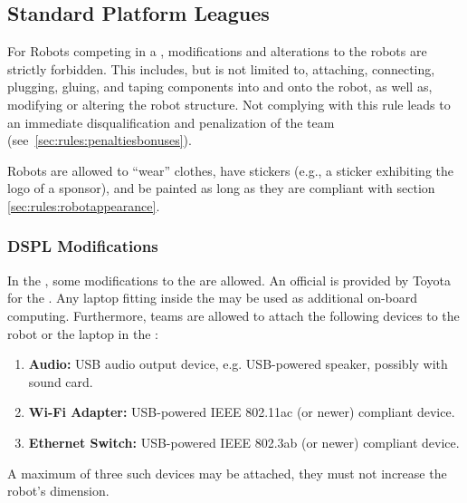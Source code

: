 \subsection{Standard Platform Leagues}
\label{sec:rules:robotappearance_spl}
For Robots competing in a \SPL{}, modifications and alterations to the robots are strictly forbidden. This includes, but is not limited to, attaching, connecting, plugging, gluing, and taping components into and onto the robot, as well as, modifying or altering the robot structure. Not complying with this rule leads to an immediate disqualification and penalization of the team (see~\ref{sec:rules:penaltiesbonuses}).

Robots are allowed to \enquote{wear} clothes, have stickers (e.g., a sticker exhibiting the logo of a sponsor), and be painted as long as they are compliant with section \ref{sec:rules:robotappearance}.

\subsubsection{DSPL Modifications}
\label{sec:rules:mountingbracket}
In the \DSPL{}, some modifications to the \HSR{} are allowed. An official \MountingBracket{} is provided by Toyota for the \HSR{}. Any laptop fitting inside the \MountingBracket{} may be used as additional on-board computing. Furthermore, teams are allowed to attach the following devices to the robot or the laptop in the \MountingBracket{}:
\begin{enumerate}
	\item \textbf{Audio:} USB audio output device, e.g. USB-powered speaker, possibly with sound card.
	\item \textbf{Wi-Fi Adapter:} USB-powered IEEE 802.11ac (or newer) compliant device.
	\item \textbf{Ethernet Switch:} USB-powered IEEE 802.3ab (or newer) compliant device.
\end{enumerate}

\noindent A maximum of three such devices may be attached, they must not increase the robot's dimension.
